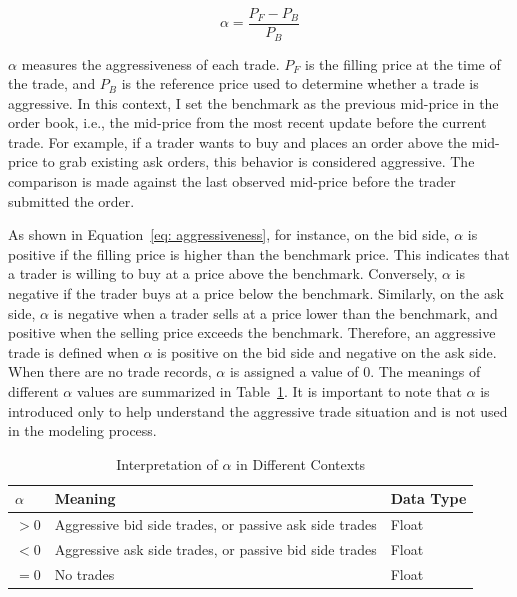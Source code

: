 \begin{equation}
    \alpha = \frac{P_F - P_B}{P_B}
    \label{eq: aggressiveness}
\end{equation}

$\alpha$ measures the aggressiveness of each trade. $P_F$ is the filling price at the time of the trade, and $P_B$ is the reference price used to determine whether a trade is aggressive. In this context, I set the benchmark as the previous mid-price in the order book, i.e., the mid-price from the most recent update before the current trade. For example, if a trader wants to buy and places an order above the mid-price to grab existing ask orders, this behavior is considered aggressive. The comparison is made against the last observed mid-price before the trader submitted the order. 

As shown in Equation~\ref{eq: aggressiveness}, for instance, on the bid side, $\alpha$ is positive if the filling price is higher than the benchmark price. This indicates that a trader is willing to buy at a price above the benchmark. Conversely, $\alpha$ is negative if the trader buys at a price below the benchmark. Similarly, on the ask side, $\alpha$ is negative when a trader sells at a price lower than the benchmark, and positive when the selling price exceeds the benchmark. Therefore, an aggressive trade is defined when $\alpha$ is positive on the bid side and negative on the ask side. When there are no trade records, $\alpha$ is assigned a value of 0. The meanings of different $\alpha$ values are summarized in Table~\ref{tb: alpha_meaning}. It is important to note that $\alpha$ is introduced only to help understand the aggressive trade situation and is not used in the modeling process. 

\begin{table}[h] 
    \centering 
    \begin{tabular}{lll} 
        \toprule 
        \textbf{$\alpha$} & \textbf{Meaning} & \textbf{Data Type} \\ 
        \midrule 
        $ > 0$ & Aggressive bid side trades, or passive ask side trades & Float \\
        $ < 0$ & Aggressive ask side trades, or passive bid side trades & Float \\ 
        $ = 0$ & No trades & Float \\  
        \bottomrule 
    \end{tabular} 
    \caption{Interpretation of $\alpha$ in Different Contexts}
    \label{tb: alpha_meaning}
\end{table}

